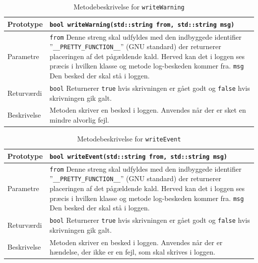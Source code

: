 \begin{table}[h]
\begin{tabularx}{\textwidth}{| L{2.5 cm} | Z |} \hline
Prototype & \texttt{bool writeWarning(std::string from, std::string msg)} \\\hline
Parametre & \texttt{from} \newline Denne streng skal udfyldes med den indbyggede identifier ''\texttt{\_\_PRETTY\_FUNCTION\_\_}'' (GNU standard) der returnerer placeringen af det pågældende kald. Herved kan det i loggen ses præcis i hvilken klasse og metode log-beskeden kommer fra. \newline \newline \texttt{msg} \newline Den besked der skal stå i loggen. \\\hline
Returværdi &  \texttt{bool} \newline Returnerer \texttt{true} hvis skrivningen er gået godt og \texttt{false} hvis skrivningen gik galt. \\\hline
Beskrivelse & Metoden skriver en besked i loggen. Anvendes når der er sket en mindre alvorlig fejl. \\\hline
\end{tabularx}
\caption{Metodebeskrivelse for \texttt{writeWarning}}
\label{table:met_writeWarning}
\end{table}

\clearpage

\begin{table}[h]
\begin{tabularx}{\textwidth}{| L{2.5 cm} | Z |} \hline
Prototype & \texttt{bool writeEvent(std::string from, std::string msg)} \\\hline
Parametre & \texttt{from} \newline Denne streng skal udfyldes med den indbyggede identifier ''\texttt{\_\_PRETTY\_FUNCTION\_\_}'' (GNU standard) der returnerer placeringen af det pågældende kald. Herved kan det i loggen ses præcis i hvilken klasse og metode log-beskeden kommer fra. \newline \newline \texttt{msg} \newline Den besked der skal stå i loggen. \\\hline
Returværdi &  \texttt{bool} \newline Returnerer \texttt{true} hvis skrivningen er gået godt og \texttt{false} hvis skrivningen gik galt. \\\hline
Beskrivelse & Metoden skriver en besked i loggen. Anvendes når der er hændelse, der ikke er en fejl, som skal skrives i loggen. \\\hline
\end{tabularx}
\caption{Metodebeskrivelse for \texttt{writeEvent}}
\label{table:met_writeEvent}
\end{table}

